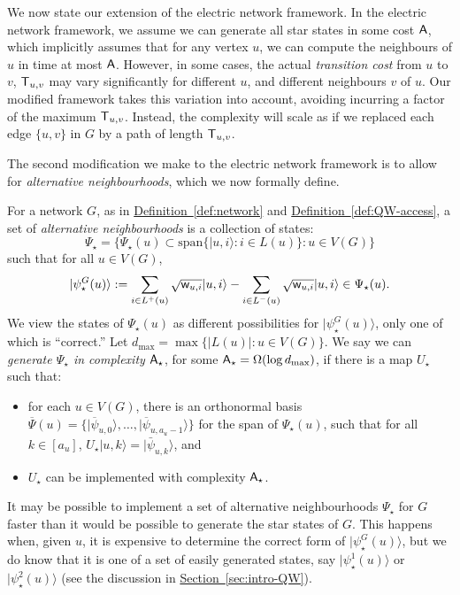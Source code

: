 \documentclass{theoretics}
\renewcommand{\sec}[1]{\hyperref[sec:#1]{Section~\ref*{sec:#1}}}
\newcommand{\defin}[1]{\hyperref[def:#1]{Definition~\ref*{def:#1}}}
\def\ket#1{{\lvert}#1\rangle}
\renewcommand{\>}{\rangle}
\newcommand{\<}{\langle}
\renewcommand{\(}{\left(}
\renewcommand{\)}{\right)}
\def\w{{\sf w}}
\begin{document}
We now state our extension of the electric network framework. 
In the electric network framework, we assume we can generate all star states in some cost ${\sf A}$, which implicitly assumes that for any vertex $u$, we can compute the neighbours of $u$ in time at most ${\sf A}$. However, in some cases, the actual \emph{transition cost} from $u$ to $v$, ${\sf T}_{u,v}$ may vary significantly for different $u$, and different neighbours $v$ of $u$. Our modified framework takes this variation into account, avoiding incurring a factor of the maximum ${\sf T}_{u,v}$. Instead, the complexity will scale as if we replaced each edge $\{u,v\}$ in $G$ by a path of length ${\sf T}_{u,v}$. 

The second modification we make to the electric network framework is to allow for \emph{alternative neighbourhoods}, which we now formally define.

\begin{definition}\label{def:alternative}
For a network $G$, as in \defin{network} and \defin{QW-access}, a set of \emph{alternative neighbourhoods} is a collection of states:
$$\Psi_\star=\{\Psi_\star(u)\subset\mathrm{span}\{\ket{u,i}:i\in L(u)\}: u\in V(G)\}$$
such that for all $u\in V(G)$, 
$$\ket{\psi_\star^G(u)}:=\sum_{i\in L^+(u)}\sqrt{\w_{u,i}}\ket{u,i}-\sum_{i\in L^-(u)}\sqrt{\w_{u,i}}\ket{u,i}\in \Psi_\star(u).$$ 
We view the states of $\Psi_\star(u)$ as different possibilities for $\ket{\psi_\star^G(u)}$, only one of which is ``correct.'' Let $d_{\max}=\max\{|L(u)|:u\in V(G)\}$. We say we can \emph{generate $\Psi_\star$ in complexity ${\sf A}_\star$}, for some ${\sf A}_{\star}=\Omega(\log d_{\max})$, if there is a map $U_\star$ such that:
\begin{itemize} 
\item for each $u\in V(G)$, there is an orthonormal basis $\overline{\Psi}(u)=\{\ket{\overline{\psi}_{u,0}},\dots,\ket{\overline{\psi}_{u,a_u-1}}\}$ for the span of $\Psi_\star(u)$, such that for all $k\in [a_u]$,
$U_{\star}\ket{u,k}=\ket{\bar\psi_{u,k}}$, and 
\item $U_\star$ can be implemented with complexity ${\sf A}_\star$.
\end{itemize}
\end{definition}

It may be possible to implement a set of alternative neighbourhoods $\Psi_\star$ for $G$ faster than it would be possible to generate the star states of $G$. This happens when, given $u$, it is expensive to determine the correct form of $\ket{\psi_\star^G(u)}$, but we do know that it is one of a set of easily generated states, say $\ket{\psi_\star^1(u)}$ or $\ket{\psi_\star^2(u)}$ (see the discussion in \sec{intro-QW}). 
\end{document}
